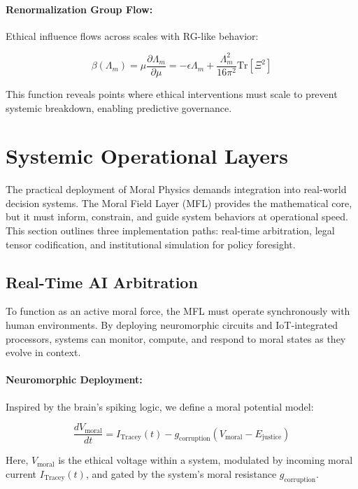 \documentclass{article}
\theoremstyle{plain}
\theoremstyle{claimstyle}
\begin{document}
\paragraph{Renormalization Group Flow:}

Ethical influence flows across scales with RG-like behavior:

\[
\beta(\Lambda_m) = \mu \frac{\partial \Lambda_m}{\partial \mu} = -\epsilon \Lambda_m + \frac{\Lambda_m^2}{16\pi^2} \text{Tr}[\Xi^2]
\]

This function reveals points where ethical interventions must scale to prevent systemic breakdown, enabling predictive governance.

\section{Systemic Operational Layers}

The practical deployment of Moral Physics demands integration into real-world decision systems. The Moral Field Layer (MFL) provides the mathematical core, but it must inform, constrain, and guide system behaviors at operational speed. This section outlines three implementation paths: real-time arbitration, legal tensor codification, and institutional simulation for policy foresight.

\subsection{Real-Time AI Arbitration}

To function as an active moral force, the MFL must operate synchronously with human environments. By deploying neuromorphic circuits and IoT-integrated processors, systems can monitor, compute, and respond to moral states as they evolve in context.

\paragraph{Neuromorphic Deployment:}

Inspired by the brain’s spiking logic, we define a moral potential model:

\[
\frac{dV_{\text{moral}}}{dt} = I_{\text{Tracey}}(t) - g_{\text{corruption}}(V_{\text{moral}} - E_{\text{justice}})
\]

Here, \(V_{\text{moral}}\) is the ethical voltage within a system, modulated by incoming moral current \(I_{\text{Tracey}}(t)\), and gated by the system's moral resistance \(g_{\text{corruption}}\).
\end{document}

